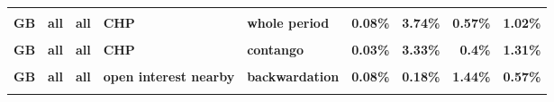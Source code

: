 \documentclass[
  authoryear,
  preprint,
  3p]{elsarticle}
\begin{document}
\begin{landscape}
\begin{longtable}[t]{>{}l>{}l>{}l>{}l>{}l>{}r>{}r>{}r>{}r}
\textbf{\cellcolor{gray!10}{GB}} & \textbf{\cellcolor{gray!10}{all}} & \textbf{\cellcolor{gray!10}{all}} & \textbf{\cellcolor{gray!10}{market}} & \textbf{\cellcolor{gray!10}{contango}} & \textcolor[HTML]{4285f4}{\textbf{\cellcolor{gray!10}{1.48\%}}} & \textcolor[HTML]{4285f4}{\textbf{\cellcolor{gray!10}{10.88\%}}} & \textcolor[HTML]{4285f4}{\textbf{\cellcolor{gray!10}{33.45\%}}} & \textcolor[HTML]{4285f4}{\textbf{\cellcolor{gray!10}{14.35\%}}}\\
\textbf{GB} & \textbf{all} & \textbf{all} & \textbf{CHP} & \textbf{whole period} & \textcolor[HTML]{4285f4}{\textbf{0.08\%}} & \textcolor[HTML]{4285f4}{\textbf{3.74\%}} & \textcolor[HTML]{4285f4}{\textbf{0.57\%}} & \textcolor[HTML]{4285f4}{\textbf{1.02\%}}\\
\textbf{\cellcolor{gray!10}{GB}} & \textbf{\cellcolor{gray!10}{all}} & \textbf{\cellcolor{gray!10}{all}} & \textbf{\cellcolor{gray!10}{CHP}} & \textbf{\cellcolor{gray!10}{backwardation}} & \textcolor[HTML]{4285f4}{\textbf{\cellcolor{gray!10}{0.24\%}}} & \textcolor[HTML]{4285f4}{\textbf{\cellcolor{gray!10}{4.26\%}}} & \textcolor[HTML]{4285f4}{\textbf{\cellcolor{gray!10}{1.09\%}}} & \textcolor[HTML]{4285f4}{\textbf{\cellcolor{gray!10}{0.72\%}}}\\
\textbf{GB} & \textbf{all} & \textbf{all} & \textbf{CHP} & \textbf{contango} & \textcolor[HTML]{4285f4}{\textbf{0.03\%}} & \textcolor[HTML]{4285f4}{\textbf{3.33\%}} & \textcolor[HTML]{4285f4}{\textbf{0.4\%}} & \textcolor[HTML]{4285f4}{\textbf{1.31\%}}\\
\addlinespace
\textbf{\cellcolor{gray!10}{GB}} & \textbf{\cellcolor{gray!10}{all}} & \textbf{\cellcolor{gray!10}{all}} & \textbf{\cellcolor{gray!10}{open interest nearby}} & \textbf{\cellcolor{gray!10}{whole period}} & \textcolor[HTML]{4285f4}{\textbf{\cellcolor{gray!10}{0.07\%}}} & \textcolor[HTML]{4285f4}{\textbf{\cellcolor{gray!10}{0.34\%}}} & \textcolor[HTML]{4285f4}{\textbf{\cellcolor{gray!10}{2.17\%}}} & \textcolor[HTML]{4285f4}{\textbf{\cellcolor{gray!10}{0.42\%}}}\\
\textbf{GB} & \textbf{all} & \textbf{all} & \textbf{open interest nearby} & \textbf{backwardation} & \textcolor[HTML]{4285f4}{\textbf{0.08\%}} & \textcolor[HTML]{4285f4}{\textbf{0.18\%}} & \textcolor[HTML]{4285f4}{\textbf{1.44\%}} & \textcolor[HTML]{4285f4}{\textbf{0.57\%}}\\
\textbf{\cellcolor{gray!10}{GB}} & \textbf{\cellcolor{gray!10}{all}} & \textbf{\cellcolor{gray!10}{all}} & \textbf{\cellcolor{gray!10}{open interest nearby}} & \textbf{\cellcolor{gray!10}{contango}} & \textcolor[HTML]{4285f4}{\textbf{\cellcolor{gray!10}{0.22\%}}} & \textcolor[HTML]{4285f4}{\textbf{\cellcolor{gray!10}{0.59\%}}} & \textcolor[HTML]{4285f4}{\textbf{\cellcolor{gray!10}{2.7\%}}} & \textcolor[HTML]{4285f4}{\textbf{\cellcolor{gray!10}{0.39\%}}}\\

\end{longtable}
\end{landscape}
\end{document}
